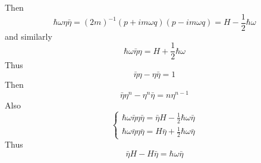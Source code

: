 Then
\begin{equation}
\hbar \omega \eta \bar{\eta}=(2m)^{-1} (p+im\omega q)(p-im\omega q)=H-\frac{1}{2}\hbar \omega
\end{equation}
and similarly
\begin{equation}
\hbar \omega \bar{\eta} \eta = H +\frac{1}{2} \hbar \omega
\end{equation}
Thus
\begin{equation}
\bar{\eta}\eta - \eta \bar{\eta} = 1
\end{equation}
Then
\begin{equation}
\bar{\eta} \eta^n - \eta^n \bar{\eta} = n \eta^{n-1}
\end{equation}
Also
\begin{equation}
\begin{cases}
\hbar \omega \bar{\eta} \eta \bar{\eta} = \bar{\eta} H - \frac{1}{2} \hbar \omega \bar{\eta} \\
\hbar \omega \bar{\eta} \eta \bar{\eta} = H \bar{\eta} + \frac{1}{2} \hbar \omega \bar{\eta}
\end{cases}
\end{equation}
Thus
\begin{equation}
\bar{\eta} H - H \bar{\eta} = \hbar \omega \bar{\eta}
\end{equation}





